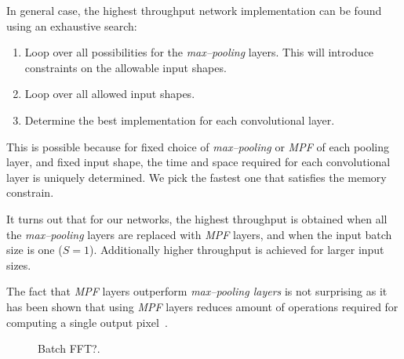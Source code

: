 \documentclass[conference]{./IEEEtran/IEEEtran}
\begin{document}
  In general case, the highest throughput network implementation can
  be found using an exhaustive search:

  \begin{enumerate}
    \item Loop over all possibilities for the \emph{max--pooling}
      layers.  This will introduce constraints on the allowable input
      shapes.
    \item Loop over all allowed input shapes.
    \item Determine the best implementation for each convolutional
      layer.
  \end{enumerate}

  This is possible because for fixed choice of \emph{max--pooling} or
  \emph{MPF} of each pooling layer, and fixed input shape, the time
  and space required for each convolutional layer is uniquely
  determined.  We pick the fastest one that satisfies the memory
  constrain.

  It turns out that for our networks, the highest throughput is
  obtained when all the \emph{max--pooling} layers are replaced
  with \emph{MPF} layers, and when the input batch size is one ($S =
  1$).  Additionally higher throughput is achieved for larger input
  sizes.

  The fact that \emph{MPF} layers outperform \emph{max--pooling
    layers} is not surprising as it has been shown that
    using \emph{MPF} layers reduces amount of operations required for
    computing a single output
    pixel~\cite{giusti2013fast,masci2013fast}.


  \begin{figure}
    \centering
    \caption{Batch FFT?.}
    \label{fig:fftbatch}
  \end{figure}
\end{document}
